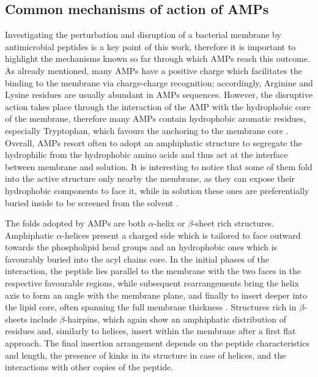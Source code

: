\subsection{Common mechanisms of action of AMPs} \label{AMP_mechs}
Investigating the perturbation and disruption of a bacterial membrane by antimicrobial peptides is a key point of this work, therefore it is important to highlight the mechanisms known so far through which AMPs reach this outcome.
%
As already mentioned, many AMPs have a positive charge which facilitates the binding to the membrane via charge-charge recognition; accordingly, Arginine and Lysine residues are usually abundant in AMPs sequences. However, the disruptive action takes place through the interaction of the AMP with the hydrophobic core of the membrane, therefore many AMPs contain hydrophobic aromatic residues, especially Tryptophan, which favours the anchoring to the membrane core \cite{Chan2006}.
%
Overall, AMPs resort often to adopt an amphiphatic structure to segregate the hydrophilic from the hydrophobic amino acids and thus act at the interface between membrane and solution. It is interesting to notice that some of them fold into the active structure only nearby the membrane, as they can expose their hydrophobic components to face it, while in solution these ones are preferentially buried inside to be screened from the solvent \cite{Nguyen2011}.

The folds adopted by AMPs are both $\alpha$-helix or $\beta$-sheet rich structures. Amphiphatic $\alpha$-helices present a charged side which is tailored to face outward towards the phospholipid head groups and an hydrophobic ones which is favourably buried into the acyl chains core. In the initial phases of the interaction, the peptide lies parallel to the membrane with the two faces in the respective favourable regions, while subsequent rearrangements bring the helix axis to form an angle with the membrane plane, and finally to insert deeper into the lipid core, often spanning the full membrane thickness \cite{Ebenhan2014}.
%
Structures rich in $\beta$-sheets include $\beta$-hairpins, which again show an amphiphatic distribution of residues and, similarly to helices, insert within the membrane after a first flat approach.
%
The final insertion arrangement depends on the peptide characteristics and length, the presence of kinks in its structure in case of helices, and the interactions with other copies of the peptide.

